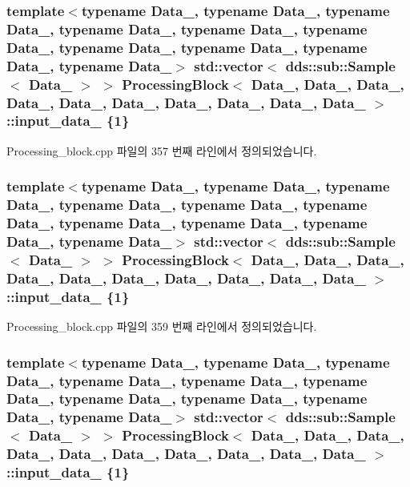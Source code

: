 \subsubsection[{\texorpdfstring{input\+\_\+data\+\_\+3}{input_data_3}}]{\setlength{\rightskip}{0pt plus 5cm}template$<$typename Data\+\_, typename Data\+\_, typename Data\+\_, typename Data\+\_, typename Data\+\_, typename Data\+\_, typename Data\+\_, typename Data\+\_, typename Data\+\_, typename Data\+\_$>$ std\+::vector$<$ dds\+::sub\+::\+Sample$<$ Data\+\_ $>$ $>$ {\bf Processing\+Block}$<$ Data\+\_, Data\+\_, Data\+\_, Data\+\_, Data\+\_, Data\+\_, Data\+\_, Data\+\_, Data\+\_, Data\+\_ $>$\+::input\+\_\+data\+\_ \{1\}}\hypertarget{classProcessingBlock_a48ced0c460950030700280d39ae4f288}{}\label{classProcessingBlock_a48ced0c460950030700280d39ae4f288}


Processing\+\_\+block.\+cpp 파일의 357 번째 라인에서 정의되었습니다.

\subsubsection[{\texorpdfstring{input\+\_\+data\+\_\+4}{input_data_4}}]{\setlength{\rightskip}{0pt plus 5cm}template$<$typename Data\+\_, typename Data\+\_, typename Data\+\_, typename Data\+\_, typename Data\+\_, typename Data\+\_, typename Data\+\_, typename Data\+\_, typename Data\+\_, typename Data\+\_$>$ std\+::vector$<$ dds\+::sub\+::\+Sample$<$ Data\+\_ $>$ $>$ {\bf Processing\+Block}$<$ Data\+\_, Data\+\_, Data\+\_, Data\+\_, Data\+\_, Data\+\_, Data\+\_, Data\+\_, Data\+\_, Data\+\_ $>$\+::input\+\_\+data\+\_ \{1\}}\hypertarget{classProcessingBlock_afe0127dd1f86dcc453e1af24452dfd17}{}\label{classProcessingBlock_afe0127dd1f86dcc453e1af24452dfd17}


Processing\+\_\+block.\+cpp 파일의 359 번째 라인에서 정의되었습니다.

\subsubsection[{\texorpdfstring{input\+\_\+data\+\_\+5}{input_data_5}}]{\setlength{\rightskip}{0pt plus 5cm}template$<$typename Data\+\_, typename Data\+\_, typename Data\+\_, typename Data\+\_, typename Data\+\_, typename Data\+\_, typename Data\+\_, typename Data\+\_, typename Data\+\_, typename Data\+\_$>$ std\+::vector$<$ dds\+::sub\+::\+Sample$<$ Data\+\_ $>$ $>$ {\bf Processing\+Block}$<$ Data\+\_, Data\+\_, Data\+\_, Data\+\_, Data\+\_, Data\+\_, Data\+\_, Data\+\_, Data\+\_, Data\+\_ $>$\+::input\+\_\+data\+\_ \{1\}}\hypertarget{classProcessingBlock_acc5d832504804bcbe6e2341cfec61a6e}{}\label{classProcessingBlock_acc5d832504804bcbe6e2341cfec61a6e}


